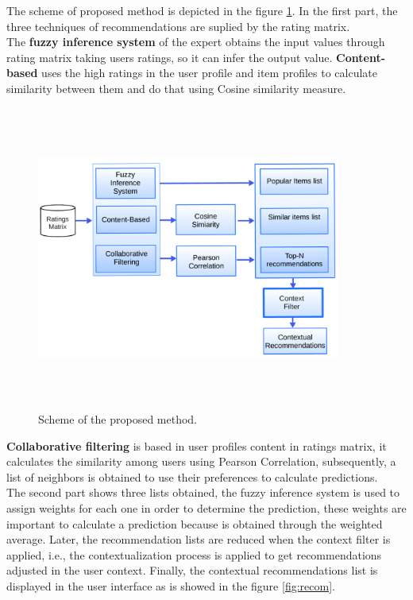 The scheme of proposed method is depicted in the figure
\ref{fig:archit}. In the first part, the three techniques of
recommendations are suplied by the rating matrix. \\ The \textbf{fuzzy
inference system} of the expert  obtains the input values  through
rating matrix taking users ratings, so it can infer the output value.
\textbf{Content-based} uses the high ratings in the user profile and item
profiles to calculate similarity between them and do that using Cosine
similarity measure.
\begin{figure}
\captionsetup{font=footnotesize}
\centering 
\includegraphics[width=10cm,height=10cm,keepaspectratio]{img/archit.png}
\caption{Scheme of the proposed method.}
\label{fig:archit}  
\end{figure}
\textbf{Collaborative filtering} is based in user profiles content in
ratings matrix, it calculates the similarity among  users using
Pearson Correlation, subsequently,  a list of neighbors is obtained to
use their preferences to calculate predictions.\\
The second part shows three lists obtained, the fuzzy inference system
is used to assign weights for each one in order to determine the
prediction, these weights are important to calculate a
prediction because is obtained through the weighted average.
Later, the recommendation lists are reduced when the context filter is
applied, i.e., the contextualization process is applied to get
recommendations adjusted in the user context. 
Finally, the contextual recommendations list is displayed in the 
user interface as is showed in the figure \ref{fig:recom}.

